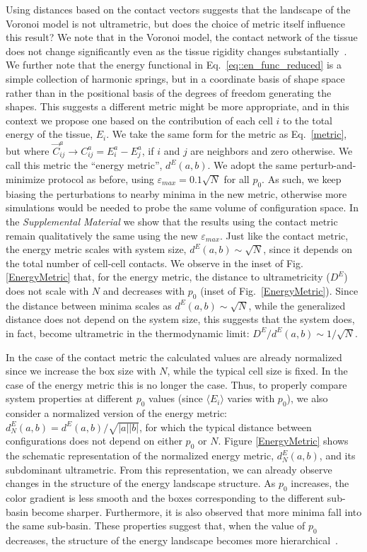 \documentclass[reprint,amsmath,amssymb,aps]{revtex4-2}
\begin{document}
Using distances based on the contact vectors suggests that the landscape of the Voronoi model is not ultrametric, but does the choice of metric itself influence this result? We note that in the Voronoi model, the contact network of the tissue does not change significantly even as the tissue rigidity changes substantially~\cite{Damavandi2021, Merkel2019}. We further note that the energy functional in Eq.~\eqref{eq::en_func_reduced} is a simple collection of harmonic springs, but in a coordinate basis of shape space rather than in the positional basis of the degrees of freedom generating the shapes. This suggests a different metric might be more appropriate, and in this context we propose one based on the contribution of each cell $i$ to the total energy of the tissue, $E_i$. We take the same form for the metric as Eq.~\eqref{metric}, but where $\vec{C}^a_{ij}\rightarrow C^a_{ij}=E^a_i-E^a_j$, if $i$ and $j$ are neighbors and zero otherwise. We call this metric the ``energy metric'', $d^E(a,b)$. We adopt the same perturb-and-minimize protocol as before, using  $\varepsilon_{max}=0.1\sqrt{N}$ for all $p_{0}$. As such, we keep biasing the perturbations to nearby minima in the new metric, otherwise more simulations would be needed to probe the same volume of configuration space. In the \textit{Supplemental Material} we show that the results using the contact metric remain qualitatively the same using the new  $\varepsilon_{max}$. Just like the contact metric, the energy metric scales with system size, $d^E(a,b)\sim\sqrt{N}$, since it depends on the total number of cell-cell contacts.  We observe in the inset of Fig. \ref{EnergyMetric} that, for the energy metric, the distance to ultrametricity ($D^E$) does not scale with $N$ and decreases with $p_0$ (inset of Fig.~\ref{EnergyMetric}). Since the distance between minima scales as $d^E(a,b)\sim\sqrt{N}$, while the generalized distance does not depend on the system size, this suggests that the system does, in fact, become ultrametric in the thermodynamic limit: $D^E/d^E(a,b)\sim 1/\sqrt{N}$.

In the case of the contact metric the calculated values are already normalized since we increase the box size with $N$, while the typical cell size is fixed. In the case of the energy metric this is no longer the case. Thus, to properly compare system properties at different $p_0$ values (since $\langle E_i\rangle$ varies with $p_0$), we also consider a normalized version of the energy metric: $d^E_N(a,b)=d^E(a,b)/\sqrt{|a| |b|}$, for which the typical distance between configurations does not depend on either $p_0$ or $N$. Figure \ref{EnergyMetric} shows the schematic representation of the normalized energy metric, $d_N^E(a,b)$, and its subdominant ultrametric. From this representation, we can already observe changes in the structure of the energy landscape structure. As $p_0$ increases, the color gradient is less smooth and the boxes corresponding to the different sub-basin become sharper. Furthermore, it is also observed that more minima fall into the same sub-basin. These properties suggest that, when the value of $p_0$ decreases, the structure of the energy landscape becomes more hierarchical~\citep{Dennis2020}.
\end{document}
